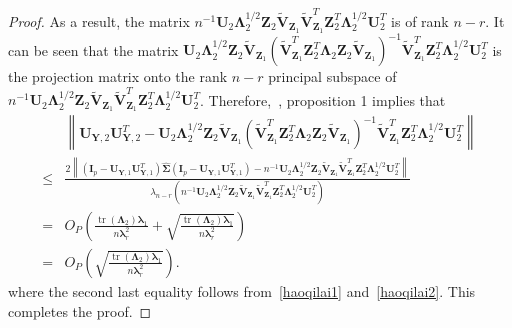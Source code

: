 \documentclass[12pt]{article} %
\DeclareMathOperator{\mytr}{tr}
\newcommand{\bZ}{\mathbf{Z}}
\newcommand{\bY}{\mathbf{Y}}
\newcommand{\bI}{\mathbf{I}}
\newcommand{\bU}{\mathbf{U}}
\newcommand{\bV}{\mathbf{V}}
\newcommand{\bfsym}[1]{\ensuremath{\boldsymbol{#1}}}
\def\blambda {\bfsym {\lambda}}
\def\bLambda {\bfsym {\Lambda}}
\def\bSigma {\bfsym {\Sigma}}
\theoremstyle{definition}
\begin{document}
\begin{appendices}
\begin{proof}
    As a result, the matrix $n^{-1}\bU_2 \bLambda_2^{1/2} \bZ_2 \tilde{\bV}_{\bZ_1}\tilde{\bV}_{\bZ_1}^T  \bZ_2^T \bLambda_2^{1/2} \bU_2^T$ is of rank $n-r$.
    It can be seen that the matrix $
            \bU_2 \bLambda_2^{1/2}\bZ_{2} \tilde{\bV}_{\bZ_1}
            \left(\tilde{\bV}_{\bZ_1}^T \bZ_2^T \bLambda_2 \bZ_2 \tilde{\bV}_{\bZ_1}\right)^{-1}
            \tilde{\bV}_{\bZ_1}^T \bZ_2^T \bLambda_2^{1/2} \bU_2^T
            $ is the projection matrix onto the rank $n-r$ principal subspace of $n^{-1}\bU_2 \bLambda_2^{1/2} \bZ_2 \tilde{\bV}_{\bZ_1}\tilde{\bV}_{\bZ_1}^T  \bZ_2^T \bLambda_2^{1/2} \bU_2^T$.
            Therefore,~\cite{Cai2015Optimal}, proposition 1 implies that
    \begin{equation*}
        \begin{split}
            &\left\|\bU_{\bY,2}\bU_{\bY,2}^{T}-
            \bU_2 \bLambda_2^{1/2}\bZ_{2} \tilde{\bV}_{\bZ_1}
            \left(\tilde{\bV}_{\bZ_1}^T \bZ_2^T \bLambda_2 \bZ_2 \tilde{\bV}_{\bZ_1}\right)^{-1}
            \tilde{\bV}_{\bZ_1}^T \bZ_2^T \bLambda_2^{1/2} \bU_2^T
            \right\|
            \\
             \leq&
             \frac{
                 2\left\|(\bI_p -\bU_{\bY,1}\bU_{\bY,1}^T)\hat{\bSigma}(\bI_p -\bU_{\bY,1}\bU_{\bY,1}^T)
             -
         n^{-1}\bU_2 \bLambda_2^{1/2} \bZ_2 \tilde{\bV}_{\bZ_1}\tilde{\bV}_{\bZ_1}^T  \bZ_2^T \bLambda_2^{1/2} \bU_2^T
             \right\|
         }{
        \lambda_{n-r}\left(
            n^{-1}\bU_2 \bLambda_2^{1/2} \bZ_2 \tilde{\bV}_{\bZ_1}\tilde{\bV}_{\bZ_1}^T  \bZ_2^T \bLambda_2^{1/2} \bU_2^T
        \right)
    }
    \\
    = &
    O_P\left(
        \frac{\mytr(\bLambda_2) \blambda_1}{n\blambda_r^2}
        +
        \sqrt{\frac{\mytr(\bLambda_2) \blambda_1}{n\blambda_r^2}}
    \right)
    \\
    = &
    O_P\left(
        \sqrt{\frac{\mytr(\bLambda_2) \blambda_1}{n\blambda_r^2}}
    \right)
    .
        \end{split}
    \end{equation*}
    where the second last equality follows from~\eqref{haoqilai1} and~\eqref{haoqilai2}.
    This completes the proof.



\end{proof}
\end{appendices}
\end{document}
